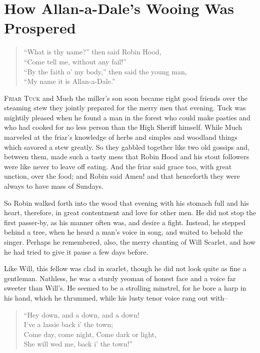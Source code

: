 \chapter{How Allan-a-Dale’s Wooing Was Prospered}

\begin{quote}
“What is thy name?” then said Robin Hood,\\
“Come tell me, without any fail!”\\
“By the faith o’ my body,” then said the young man,\\
“My name it is Allan-a-Dale.”
\end{quote}

\lettrine{F}{riar Tuck} and Much the miller's son soon became right good
friends over the steaming stew they jointly prepared for the merry men
that evening. Tuck was mightily pleased when he found a man in the forest
who could make pasties and who had cooked for no less person than the
High Sheriff himself. While Much marveled at the friar's knowledge of
herbs and simples and woodland things which savored a stew greatly. So
they gabbled together like two old gossips and, between them, made such a
tasty mess that Robin Hood and his stout followers were like never to
leave off eating. And the friar said grace too, with great unction, over
the food; and Robin said Amen! and that henceforth they were always to
have mass of Sundays.

So Robin walked forth into the wood that evening with his stomach full
and his heart, therefore, in great contentment and love for other men.
He did not stop the first passer-by, as his manner often was, and desire
a fight. Instead, he stepped behind a tree, when he heard a man's voice
in song, and waited to behold the singer. Perhaps he remembered, also,
the merry chanting of Will Scarlet, and how he had tried to give it
pause a few days before.

Like Will, this fellow was clad in scarlet, though he did not look quite
as fine a gentleman. Nathless, he was a sturdy yeoman of honest face and
a voice far sweeter than Will's. He seemed to be a strolling minstrel,
for he bore a harp in his hand, which he thrummed, while his lusty tenor
voice rang out with--

\begin{quote}
“Hey down, and a down, and a down!\\
I’ve a lassie back i’ the town;\\
Come day, come night, Come dark or light,\\
She will wed me, back i’ the town!”
\end{quote}

